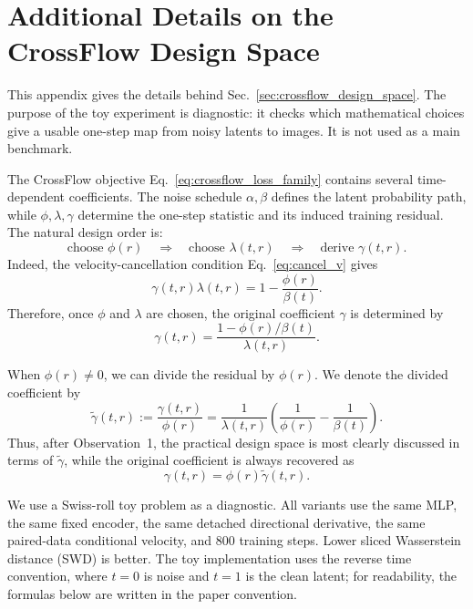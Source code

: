 \section{Additional Details on the CrossFlow Design Space}
\label{app:crossflow_design_space}

This appendix gives the details behind Sec.~\ref{sec:crossflow_design_space}. The purpose of the toy experiment is diagnostic: it checks which mathematical choices give a usable one-step map from noisy latents to images. It is not used as a main benchmark.

The CrossFlow objective Eq.~\eqref{eq:crossflow_loss_family} contains several time-dependent coefficients. The noise schedule $\alpha,\beta$ defines the latent probability path, while $\phi,\lambda,\gamma$ determine the one-step statistic and its induced training residual. The natural design order is:
\[
\text{choose } \phi(r)
\quad\Longrightarrow\quad
\text{choose } \lambda(t,r)
\quad\Longrightarrow\quad
\text{derive } \gamma(t,r).
\]
Indeed, the velocity-cancellation condition Eq.~\eqref{eq:cancel_v} gives
\begin{equation}
\gamma(t,r)\lambda(t,r)
=
1-\frac{\phi(r)}{\beta(t)}.
\label{eq:app_cancel_v}
\end{equation}
Therefore, once $\phi$ and $\lambda$ are chosen, the original coefficient $\gamma$ is determined by
\begin{equation}
\gamma(t,r)
=
\frac{1-\phi(r)/\beta(t)}{\lambda(t,r)}.
\label{eq:app_gamma_from_phi_lambda}
\end{equation}

When $\phi(r)\neq0$, we can divide the residual by $\phi(r)$. We denote the divided coefficient by
\begin{equation}
\tilde{\gamma}(t,r)
:=
\frac{\gamma(t,r)}{\phi(r)}
=
\frac{1}{\lambda(t,r)}
\left(
\frac{1}{\phi(r)}
-
\frac{1}{\beta(t)}
\right).
\label{eq:app_tilde_gamma_from_phi_lambda}
\end{equation}
Thus, after Observation~1, the practical design space is most clearly discussed in terms of $\tilde{\gamma}$, while the original coefficient is always recovered as
\begin{equation}
\gamma(t,r)=\phi(r)\tilde{\gamma}(t,r).
\label{eq:app_gamma_recover}
\end{equation}

We use a Swiss-roll toy problem as a diagnostic. All variants use the same MLP, the same fixed encoder, the same detached directional derivative, the same paired-data conditional velocity, and 800 training steps. Lower sliced Wasserstein distance (SWD) is better. The toy implementation uses the reverse time convention, where $t=0$ is noise and $t=1$ is the clean latent; for readability, the formulas below are written in the paper convention.


